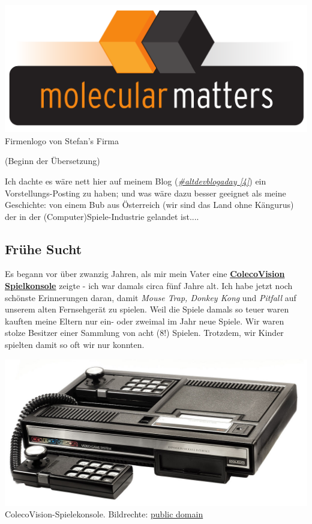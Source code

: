 \documentclass[10pt,a4paper,ngerman,twoside]{article} %
\begin{document}
\begin{multicols}{3}
\begin{center}
\includegraphics[width=0.8\linewidth]{austrianguy/molecularmatters.png} \\
\footnotesize{Firmenlogo von Stefan's Firma}
\end{center}

(Beginn der Übersetzung)

Ich dachte es wäre nett hier auf meinem Blog (\href{http://www.altdevblogaday.com/}{\textit{\#altdevblogaday [4]}}) ein Vorstellungs-Posting zu haben; und was wäre dazu besser geeignet als meine Geschichte: von einem Bub aus Österreich (wir sind das Land ohne Kängurus) der in der (Computer)Spiele-Industrie gelandet ist....

\subsection*{Frühe Sucht}

Es begann vor über zwanzig Jahren, als mir mein Vater eine \href{https://de.wikipedia.org/wiki/Colecovision}{\textbf{ColecoVision Spielkonsole}} 
zeigte - ich war damals circa fünf Jahre alt. Ich habe jetzt noch schönste Erinnerungen daran, damit \textit{Mouse Trap, Donkey Kong} und \textit{Pitfall} auf unserem alten Fernsehgerät zu spielen. Weil die Spiele damals so teuer waren kauften meine Eltern nur ein- oder zweimal im Jahr neue Spiele. Wir waren stolze Besitzer einer Sammlung von acht (8!) Spielen. Trotzdem, wir Kinder spielten damit so oft wir nur konnten.
\begin{center}
\includegraphics[width=0.9\linewidth]{austrianguy/austrianguy-colecovision.jpg}\\
\footnotesize{ColecoVision-Spielekonsole. Bildrechte: \href{https://commons.wikimedia.org/wiki/File:Coleco-vision-console.jpg}{public domain}}
\end{center}


\end{multicols}
\end{document}
